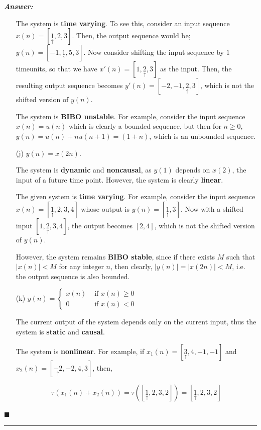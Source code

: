 \documentclass[12pt]{article}
\theoremstyle{definition}
\newenvironment{answer}{
    \textbf{\textit{Answer:}} \qquad
}{\hfill $\blacksquare$ \\ \begin{center}
    \rule{0.6\linewidth}{0.5px}    
\end{center}
}
\begin{document}
\begin{answer}
\begin{enumerate}
        The system is \textbf{time varying}. To see this, consider an input sequence $x(n) = [\underset{\uparrow}{1}, 2, 3]$. Then, the output sequence would be; $y(n) = [-1, \underset{\uparrow}{1}, 5, 3]$. Now consider shifting the input sequence by $1$ timeunits, so that we have $x'(n) = [1, \underset{\uparrow}{2}, 3]$ as the input. Then, the resulting output sequence becomes $y'(n) = [-2, -1, \underset{\uparrow}{2}, 3]$, which is not the shifted version of $y(n)$.

        The system is \textbf{BIBO unstable}. For example, consider the input sequence $x(n) = u(n)$ which is clearly a bounded sequence, but then for $n \geq 0$, $y(n) = u(n) + n u(n + 1) = (1 + n)$, which is an unbounded sequence.

        \item[(j)] $y(n) = x(2n)$.
        
        The system is \textbf{dynamic} and \textbf{noncausal}, as $y(1)$ depends on $x(2)$, the input of a future time point. However, the system is clearly \textbf{linear}. 
        
        The given system is \textbf{time varying}. For example, consider the input sequence $x(n) = [\underset{\uparrow}{1}, 2, 3, 4]$ whose output is $y(n) = [\underset{\uparrow}{1}, 3]$. Now with a shifted input $[1, \underset{\uparrow}{2}, 3, 4]$, the output becomes $[2, 4]$, which is not the shifted version of $y(n)$.

        However, the system remains \textbf{BIBO stable}, since if there exists $M$ such that $\vert x(n) \vert < M$ for any integer $n$, then clearly, $\vert y(n) \vert = \vert x(2n) \vert < M$, i.e. the output sequence is also bounded.

        \item[(k)] $y(n) = \begin{cases}
            x(n) & \text{ if } x(n) \geq 0\\
            0 & \text{ if } x(n) < 0
        \end{cases}$

        The current output of the system depends only on the current input, thus the system is \textbf{static} and \textbf{causal}. 

        The system is \textbf{nonlinear}. For example, if $x_1(n) = [\underset{\uparrow}{3}, 4, -1, -1]$ and $x_2(n) = [\underset{\uparrow}{-2}, -2, 4, 3]$, then, 

        $$
        \tau(x_1(n) + x_2(n)) = \tau([\underset{\uparrow}{1}, 2, 3, 2]) = [\underset{\uparrow}{1}, 2, 3, 2]
        $$


\end{enumerate}
\end{answer}
\end{document}
